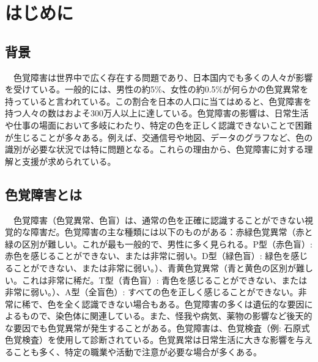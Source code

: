 \tableofcontents
\newpage

\pagestyle{fancy}
\fancyhf{}
\renewcommand{\headrulewidth}{0pt}
\makeatletter
\let\ps@plain\ps@fancy
\makeatother
\setlength{\headsep}{20pt}

\chapter{はじめに}
\section{背景}
　色覚障害は世界中で広く存在する問題であり、日本国内でも多くの人々が影響を受けている。一般的には、男性の約5\%、女性の約0.5\%が何らかの色覚異常を持っていると言われている。この割合を日本の人口に当てはめると、色覚障害を持つ人々の数はおよそ300万人以上に達している。色覚障害の影響は、日常生活や仕事の場面において多岐にわたり、特定の色を正しく認識できないことで困難が生じることが多々ある。例えば、交通信号や地図、データのグラフなど、色の識別が必要な状況では特に問題となる。これらの理由から、色覚障害に対する理解と支援が求められている。

\section{色覚障害とは}
　色覚障害（色覚異常、色盲）は、通常の色を正確に認識することができない視覚的な障害だ。色覚障害の主な種類には以下のものがある：赤緑色覚異常（赤と緑の区別が難しい。これが最も一般的で、男性に多く見られる。P型（赤色盲）: 赤色を感じることができない、または非常に弱い。D型（緑色盲）: 緑色を感じることができない、または非常に弱い。）、青黄色覚異常（青と黄色の区別が難しい。これは非常に稀だ。T型（青色盲）: 青色を感じることができない、または非常に弱い。）、A型（全盲色）: すべての色を正しく感じることができない。非常に稀で、色を全く認識できない場合もある。色覚障害の多くは遺伝的な要因によるもので、染色体に関連している。また、怪我や病気、薬物の影響など後天的な要因でも色覚異常が発生することがある。色覚障害は、色覚検査（例: 石原式色覚検査）を使用して診断されている。色覚異常は日常生活に大きな影響を与えることも多く、特定の職業や活動で注意が必要な場合が多くある。
